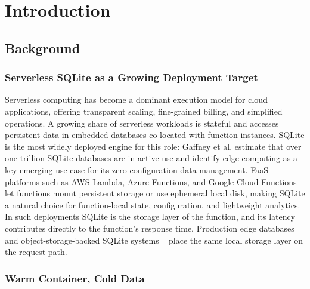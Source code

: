 \documentclass[sigconf, nonacm]{acmart}
\begin{document}
\maketitle

\vldbtopmatter

\section{Introduction}\label{sec:introduction}

\subsection{Background}\label{sec:background}

\subsubsection{Serverless SQLite as a Growing Deployment Target}\label{sec:serverless-sqlite}

Serverless computing has become a dominant execution model for cloud applications, offering transparent scaling, fine-grained billing, and simplified operations. A growing share of serverless workloads is stateful and accesses persistent data in embedded databases co-located with function instances. SQLite is the most widely deployed engine for this role: Gaffney et al. \cite{Gaffney2022} estimate that over one trillion SQLite databases are in active use and identify edge computing as a key emerging use case for its zero-configuration data management. FaaS platforms such as AWS Lambda, Azure Functions, and Google Cloud Functions let functions mount persistent storage or use ephemeral local disk, making SQLite a natural choice for function-local state, configuration, and lightweight analytics. In such deployments SQLite is the storage layer of the function, and its latency contributes directly to the function's response time. Production edge databases and object-storage-backed SQLite systems ~\cite{CloudflareD1, SqliteWebVfs, Turbolite} place the same local storage layer on the request path.

\subsubsection{Warm Container, Cold Data}\label{sec:warm-container}
\end{document}
